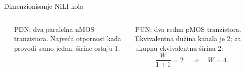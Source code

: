 \begin{frame}[label=09_3-s028]{Dimenzionisanje NILI kola}
\begin{columns}[c,onlytextwidth]
\begin{center}

\end{center}
\alert{PDN:} dva paralelna nMOS tranzistora. Najveća otpornost kada provodi samo jedan; širine ostaju 1.
\par\bigskip
\alert{PUN:} dva redna pMOS tranzistora. Ekvivalentna dužina kanala je 2; za ukupnu ekvivalentnu širinu 2:
\[\frac W{1+1}=2\quad\Longrightarrow\quad W=4.\]
\end{columns}
\end{frame}
